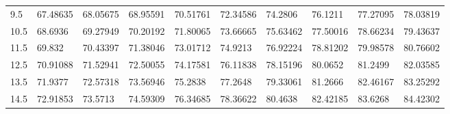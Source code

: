 \documentclass[10pt,twocolumn,letterpaper]{article}
\begin{document}
\begin{table}
\begin{tabular}{llllllllll}
    9.5             & 67.48635                               & 68.05675                               & 68.95591                                & 70.51761                                & 72.34586                                & 74.2806                                 & 76.1211                                 & 77.27095                                & 78.03819                                \\
    10.5            & 68.6936                                & 69.27949                               & 70.20192                                & 71.80065                                & 73.66665                                & 75.63462                                & 77.50016                                & 78.66234                                & 79.43637                                \\
    11.5            & 69.832                                 & 70.43397                               & 71.38046                                & 73.01712                                & 74.9213                                 & 76.92224                                & 78.81202                                & 79.98578                                & 80.76602                                \\
    12.5            & 70.91088                               & 71.52941                               & 72.50055                                & 74.17581                                & 76.11838                                & 78.15196                                & 80.0652                                 & 81.2499                                 & 82.03585                                \\
    13.5            & 71.9377                                & 72.57318                               & 73.56946                                & 75.2838                                 & 77.2648                                 & 79.33061                                & 81.2666                                 & 82.46167                                & 83.25292                                \\
    14.5            & 72.91853                               & 73.5713                                & 74.59309                                & 76.34685                                & 78.36622                                & 80.4638                                 & 82.42185                                & 83.6268                                 & 84.42302                                \\

\end{tabular}
\end{table}
\end{document}
